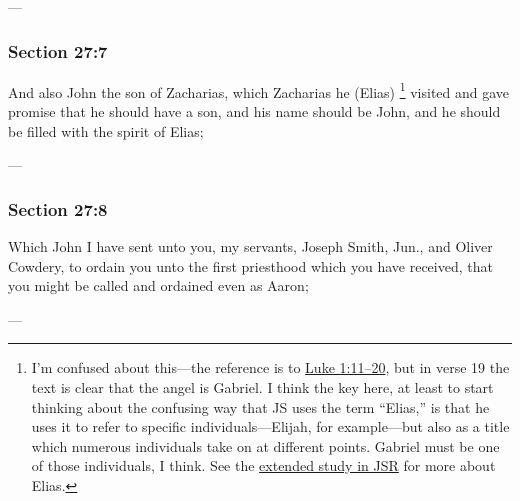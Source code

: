 		\begin{framed}
		\scriptsize
			\begin{compactdesc}
				\item[JSP] ---
			\end{compactdesc}
		\end{framed}

	\subsubsection{Section 27:7} %
		\label{DC27-7}

		And also John the son of Zacharias, which Zacharias he (Elias)%
			\footnote{%
				I'm confused about this---the reference is to \hyperref[LUKE-1-11]{Luke 1:11--20}, but in verse 19 the text is clear that the angel is Gabriel. I think the key here, at least to start thinking about the confusing way that JS uses the term ``Elias,'' is that he uses it to refer to specific individuals---Elijah, for example---but also as a title which numerous individuals take on at different points. Gabriel must be one of those individuals, I think. See the \hyperref[EXSS-DC27-JSR-ELIAS]{extended study in JSR} for more about Elias.
				}
		visited and gave promise that he should have a son, and his name should be John, and he should be filled with the spirit of Elias;

		\begin{framed}
		\scriptsize
			\begin{compactdesc}
				\item[JSP] ---
			\end{compactdesc}
		\end{framed}

	\subsubsection{Section 27:8} %
		\label{DC27-8}

		Which John I have sent unto you, my servants, Joseph Smith, Jun., and Oliver Cowdery, to ordain you unto the first priesthood which you have received, that you might be called and ordained even as Aaron;

		\begin{framed}
		\scriptsize
			\begin{compactdesc}
				\item[JSP] ---
			\end{compactdesc}
		\end{framed}

